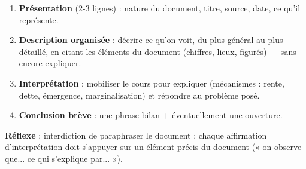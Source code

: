 \documentclass[11pt]{article}
\begin{document}
\begin{methode}
\begin{enumerate}
\item \textbf{Présentation} (2-3 lignes) : nature du document, titre, source, date, ce qu'il représente.
\item \textbf{Description organisée} : décrire ce qu'on voit, du plus général au plus détaillé, en citant les éléments du document (chiffres, lieux, figurés) — sans encore expliquer.
\item \textbf{Interprétation} : mobiliser le cours pour expliquer (mécanismes : rente, dette, émergence, marginalisation) et répondre au problème posé.
\item \textbf{Conclusion brève} : une phrase bilan + éventuellement une ouverture.
\end{enumerate}
\textbf{Réflexe} : interdiction de paraphraser le document ; chaque affirmation d'interprétation doit s'appuyer sur un élément précis du document (« on observe que... ce qui s'explique par... »).
\end{methode}
\end{document}
